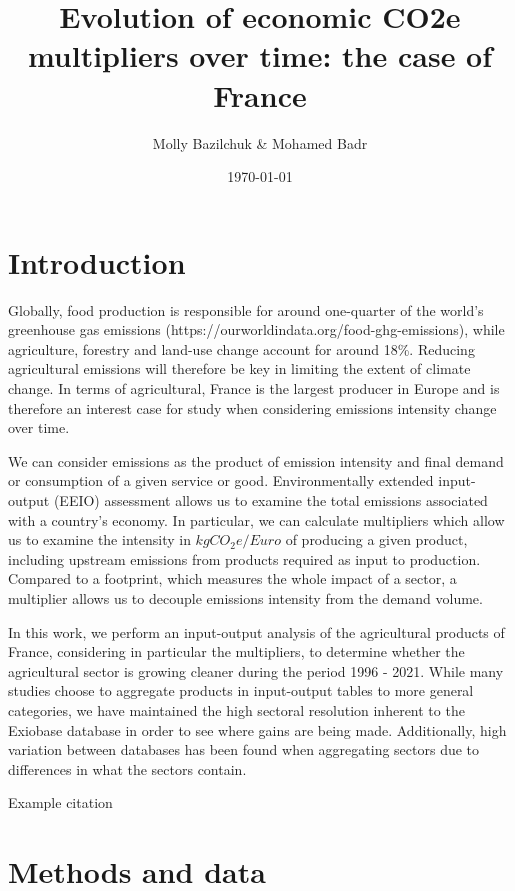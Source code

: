 \documentclass[a4paper,twoside]{article}
\title{Evolution of economic CO2e multipliers over time: the case of France}
\author{Molly Bazilchuk & Mohamed Badr}
\date{\today}
\begin{document}
\maketitle
\vspace{3cm}


\section{Introduction}

Globally, food production is responsible for around one-quarter of the world's greenhouse gas emissions (https://ourworldindata.org/food-ghg-emissions), while agriculture, forestry and land-use change account for around 18\%. Reducing agricultural emissions will therefore be key in limiting the extent of climate change. In terms of agricultural, France is the largest producer in Europe and is therefore an interest case for study when considering emissions intensity change over time.

We can consider emissions as the product of emission intensity and final demand or consumption of a given service or good. Environmentally extended input-output (EEIO) assessment allows us to examine the total emissions associated with a country's economy. In particular, we can calculate multipliers which allow us to examine the intensity in $kgCO_2e/Euro$ of producing a given product, including upstream emissions from products required as input to production. Compared to a footprint, which measures the whole impact of a sector, a multiplier allows us to decouple emissions intensity from the demand volume.

In this work, we perform an input-output analysis of the agricultural products of France, considering in particular the multipliers, to determine whether the agricultural sector is growing cleaner during the period 1996 - 2021. While many studies choose to aggregate products in input-output tables to more general categories, we have maintained the high sectoral resolution inherent to the Exiobase database in order to see where gains are being made. Additionally, high variation between databases has been found when aggregating sectors due to differences in what the sectors contain.

Example citation \cite{Schneider2009}

\section{Methods and data}
\end{document}
